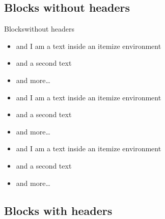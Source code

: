 \documentclass[%
	english,  %
	]{beamer}
\begin{document}
\subsection{Blocks without headers}

\begin{frame}{Blocks}{without headers}
\begin{block}{}
\begin{itemize}
\item and I am a text inside an itemize environment
\item and a second text
\item and more\ldots
\end{itemize}
\end{block}

\vfill

\begin{exampleblock}{}
\begin{itemize}
\item and I am a text inside an itemize environment
\item and a second text
\item and more\ldots
\end{itemize}
\end{exampleblock}

\vfill

\begin{alertblock}{}
\begin{itemize}
\item and I am a text inside an itemize environment
\item and a second text
\item and more\ldots
\end{itemize}
\end{alertblock}
\end{frame}


\subsection{Blocks with headers}
\end{document}
